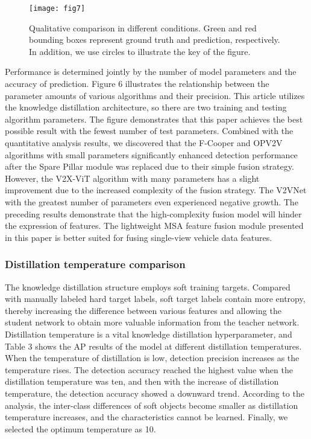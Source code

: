 \documentclass[lettersize,journal]{IEEEtran}
\begin{document}
\begin{figure*}[!b]
\texttt{[image: fig7]}
\caption{Qualitative comparison in different conditions. Green and red bounding boxes represent ground truth and prediction, respectively. In addition, we use circles to illustrate the key of the figure.}
\label{fig_7}
\end{figure*}
Performance is determined jointly by the number of model parameters and the accuracy of prediction. Figure 6 illustrates the relationship between the parameter amounts of various algorithms and their precision. This article utilizes the knowledge distillation architecture, so there are two training and testing algorithm parameters. The figure demonstrates that this paper achieves the best possible result with the fewest number of test parameters. Combined with the quantitative analysis results, we discovered that the F-Cooper and OPV2V algorithms with small parameters significantly enhanced detection performance after the Spare Pillar module was replaced due to their simple fusion strategy. However, the V2X-ViT algorithm with many parameters has a slight improvement due to the increased complexity of the fusion strategy. The V2VNet with the greatest number of parameters even experienced negative growth. The preceding results demonstrate that the high-complexity fusion model will hinder the expression of features. The lightweight MSA feature fusion module presented in this paper is better suited for fusing single-view vehicle data features.



\subsubsection{Distillation temperature comparison}
The knowledge distillation structure employs soft training targets. Compared with manually labeled hard target labels, soft target labels contain more entropy, thereby increasing the difference between various features and allowing the student network to obtain more valuable information from the teacher network. Distillation temperature is a vital knowledge distillation hyperparameter, and Table 3 shows the AP results of the model at different distillation temperatures. When the temperature of distillation is low, detection precision increases as the temperature rises. The detection accuracy reached the highest value when the distillation temperature was ten, and then with the increase of distillation temperature, the detection accuracy showed a downward trend. According to the analysis, the inter-class differences of soft objects become smaller as distillation temperature increases, and the characteristics cannot be learned. Finally, we selected the optimum temperature as 10.
\end{document}

